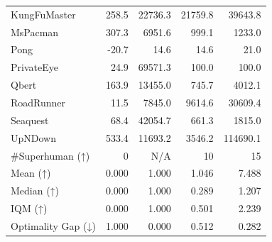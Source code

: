 \begin{table}[h]
\begin{center}
\begin{small}
{\begin{tabular}{lrr rr}
KungFuMaster         &  258.5     &  22736.3   &  21759.8   & 39643.8   \\
MsPacman             &  307.3     &  6951.6    &  999.1     & 1233.0    \\
Pong                 &  -20.7     &  14.6      &  14.6      & 21.0      \\
PrivateEye           &  24.9      &  69571.3   &  100.0     & 100.0     \\
Qbert                &  163.9     &  13455.0   &  745.7     & 4012.1    \\
RoadRunner           &  11.5      &  7845.0    &  9614.6    & 30609.4   \\
Seaquest             &  68.4      &  42054.7   &  661.3     & 1815.0    \\
UpNDown              &  533.4     &  11693.2   &  3546.2    & 114690.1  \\
\midrule
\#Superhuman (↑)     &  0         &  N/A       &  10        & 15        \\
Mean (↑)             &  0.000     &  1.000     &  1.046     & 7.488     \\
Median (↑)           &  0.000     &  1.000     &  0.289     & 1.207     \\
IQM (↑)              &  0.000     &  1.000     &  0.501     & 2.239     \\
Optimality Gap (↓)   &  1.000     &  0.000     &  0.512     & 0.282     \\
\bottomrule
\end{tabular}
 }
\end{small}
\end{center}
\vspace{-0.02\linewidth}
\end{table}